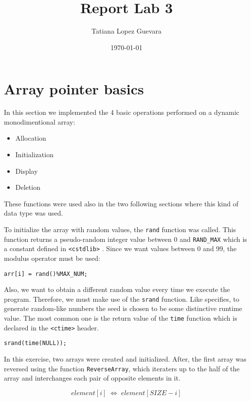 \documentclass{article}
\begin{document}
\title{Report Lab 3}
\date {\today}
\author{Tatiana Lopez Guevara}
\maketitle

\section{Array pointer basics}

In this section we implemented the 4 basic operations performed
on a dynamic monodimentional array:

\begin{itemize}
\item Allocation
\item Initialization
\item Display
\item Deletion
\end{itemize} 

These functions were used also in the two following sections
where this kind of data type was used.

To initialize the array with random values, the \verb+rand+ function
was called. This function returns a pseudo-random integer value
between 0 and \verb+RAND_MAX+ which is a constant
defined in \verb+<cstdlib>+ \cite{rand}. Since we want values between 0 and 
99, the modulus operator must be used:

\begin{verbatim}
arr[i] = rand()%MAX_NUM;
\end{verbatim} 

Also, we want to obtain a different random value
every time we execute the program. Therefore, we must make use
of the \verb+srand+ function.
Like \cite{srand} specifies, to generate random-like numbers
the seed is chosen to be some distinctive runtime value.
The most common one is the return value of the \verb+time+ function
which is declared in the \verb+<ctime>+ header.

\begin{verbatim}
srand(time(NULL));
\end{verbatim} 

In this exercise, two arrays were created and initialized.
After, the first array was reversed using the function \verb+ReverseArray+,
which iteraters up to the half of the array and interchanges each pair of opposite elements
in it.

\begin{equation*}
element[i] \;\Leftrightarrow \; element[SIZE - i]
\end{equation*} 
\end{document}
